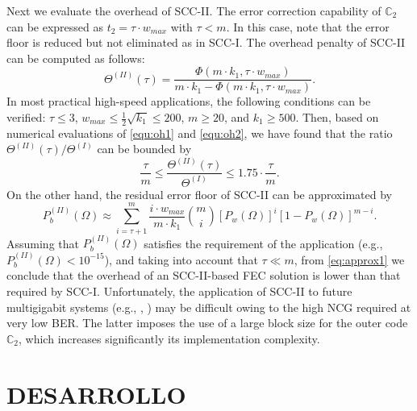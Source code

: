 \documentclass[conference]{IEEEtran}
\newcommand{\C}{\mathbb{C}}  %
\begin{document}
Next we evaluate the overhead of SCC-II. The error correction
capability of $\C_2$ can be expressed as $t_2=\tau \cdot w_{max}$ with
$\tau < m$. In this case, note that the error floor is reduced but not
eliminated as in SCC-I. The overhead penalty of SCC-II can be computed
as follows:
\begin{equation}
\label{equ:oh2}
 \Theta^{(I\!I)}(\tau) = \frac{\Phi(m\cdot k_1,\tau \cdot
   w_{max})}{m\cdot k_1-\Phi(m\cdot k_1,\tau \cdot w_{max})}.
\end{equation}
In most practical high-speed applications, the following conditions
can be verified: $\tau\leq 3$, $w_{max}\leq \frac{1}{2}\sqrt{k_1}\leq
200$, $m \geq 20$, and $k_1 \geq 500$. Then, based on numerical
evaluations of \eqref{equ:oh1} and \eqref{equ:oh2}, we have found that
the ratio $\Theta^{(I\!I)}(\tau)/\Theta^{(I)}$ can be bounded by
\begin{equation}\label{eq:approx1}
  \frac{\tau}{m} \leq \frac{\Theta^{(I\!I)}(\tau)}{\Theta^{(I)}} \leq 1.75\cdot \frac{\tau}{m}.
\end{equation}
On the other hand, the residual error floor of SCC-II can be
approximated by
\begin{equation}\label{equ:errorfloor1}
  P_b^{(I\!I)}(\Omega) \approx \sum_{i=\tau+1}^m \frac{i\cdot w_{max}}{m\cdot k_1}\binom{m}{i}[P_w(\Omega)]^i[1-P_w(\Omega)]^{m-i}.
\end{equation}
Assuming that $P_b^{(I\!I)}(\Omega)$ satisfies the requirement of the
application (e.g., $P_b^{(I\!I)}(\Omega)<10^{-15}$), and taking into
account that $\tau \ll m$, from \eqref{eq:approx1} we conclude that
the overhead of an SCC-II-based FEC solution is lower than that
required by SCC-I. Unfortunately, the application of SCC-II to future
multigigabit systems (e.g., \cite{OSKY2010}, \cite{VK2005}) may be
difficult owing to the high NCG required at very low BER. The latter
imposes the use of a large block size for the outer code $\C_2$, which
increases significantly its implementation complexity.

\section{DESARROLLO} \label{sec:proposed_scheme}
\end{document}
